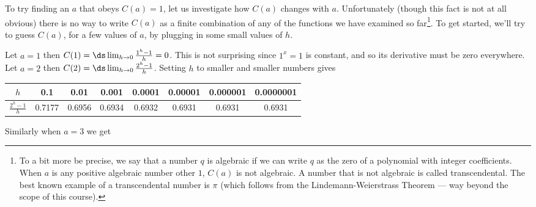 To try finding an $a$ that obeys $C(a)=1$, let us investigate how $C(a)$ changes
with
$a$. Unfortunately (though this fact is not at all obvious) there is no way to
write
$C(a)$ as a finite combination of any of the functions we have examined
so far\footnote{To a bit more be precise, we say that a number $q$ is algebraic
if we can
write $q$ as the zero of a polynomial with integer coefficients. When $a$ is any
positive
algebraic number other $1$, $C(a)$ is not algebraic. A number that is not
algebraic is
called transcendental. The best known example of a transcendental number is
$\pi$ (which
follows from the Lindemann-Weierstrass Theorem --- way beyond the scope of this
course).}. To get started, we'll try to guess $C(a)$, for a few values of
$a$, by plugging in some small values of $h$.
\begin{eg}\label{eg log est}
Let $a =1$ then $C(1) = \ds \lim_{h \to 0} \frac{1^h-1}{h} = 0$. This is not
surprising
since $1^x=1$ is constant, and so its derivative must be zero everywhere. Let $a
=2$
then $C(2) = \ds \lim_{h \to 0} \frac{2^h-1}{h}$. Setting $h$ to smaller and
smaller
numbers gives
\begin{center}
   \renewcommand{\arraystretch}{1.2}
   \begin{tabular}{|c||c|c|c|c|c|c|c|}
       \hline
       $h$ & 0.1 & 0.01 & 0.001 & 0.0001 & 0.00001 & 0.000001 & 0.0000001 \\
       \hline
       $\tfrac{2^h-1}{h}$ & 0.7177 & 0.6956 & 0.6934 & 0.6932 &
             0.6931 & 0.6931 & 0.6931 \\ \hline
     \end{tabular}
     \renewcommand{\arraystretch}{1.0}
\end{center}
Similarly when $a=3$ we get

\end{eg}
